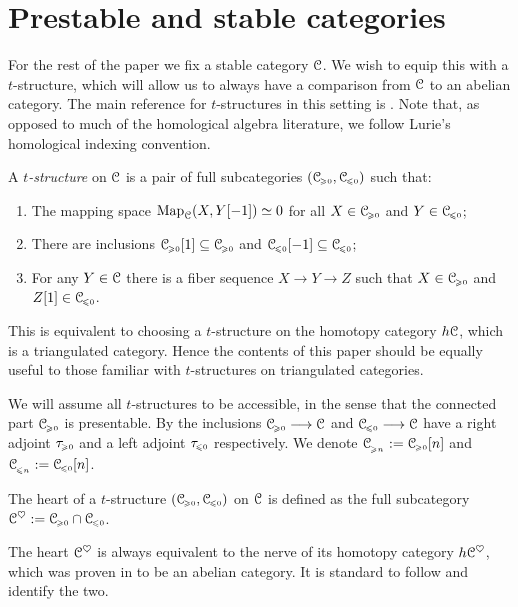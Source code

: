 
\section{Prestable and stable categories}
\label{ch3:sec:prestable-and-stable-categories}

For the rest of the paper we fix a stable category $\C$. We wish to equip this with a $t$-structure, which will allow us to always have a comparison from $\C$ to an abelian category. The main reference for $t$-structures in this setting is \cite[Sec 1.2.1]{Lurie_HA}. Note that, as opposed to much of the homological algebra literature, we follow Lurie's homological indexing convention.  

\begin{definition}
    A \emph{$t$-structure} on $\C$ is a pair of full subcategories $(\C\geqz, \C\leqz)$ such that:
    \begin{enumerate}
        \item The mapping space $\Map_\C(X,Y[-1])\simeq 0$ for all $X\in \C\geqz$ and $Y\in \C\leqz$;
        \item There are inclusions $\C\geqz[1]\subseteq \C\geqz$ and $\C\leqz[-1]\subseteq \C\leqz$;
        \item For any $Y\in \C$ there is a fiber sequence $X\to Y\to Z$ such that $X\in \C\geqz$ and $Z[1]\in \C\leqz$. 
    \end{enumerate} 
\end{definition}

This is equivalent to choosing a $t$-structure on the homotopy category $h\C$, which is a triangulated category. Hence the contents of this paper should be equally useful to those familiar with $t$-structures on triangulated categories. 

We will assume all $t$-structures to be accessible, in the sense that the connected part $\C\geqz$ is presentable. By \cite[1.2.16]{Lurie_HA} the inclusions $\C\geqz\to \C$ and $\C\leqz\to \C$ have a right adjoint $\tau\geqz$ and a left adjoint $\tau\leqz$ respectively. We denote $\C_{\geqn} := \C\geqz[n]$ and $\C_{\leqn} := \C\leqz[n]$. 

\begin{definition}
    The heart of a $t$-structure $(\C\geqz, \C\leqz)$ on $\C$ is defined as the full subcategory $\C^\heart := \C\geqz\cap\C\leqz$.
\end{definition}

The heart $\C^\heart$ is always equivalent to the nerve of its homotopy category $h\C^\heart$, which was proven in \cite{beilinson-bernstein-deligne_1983} to be an abelian category. It is standard to follow \cite[1.2.1.12]{Lurie_HA} and identify the two. 


